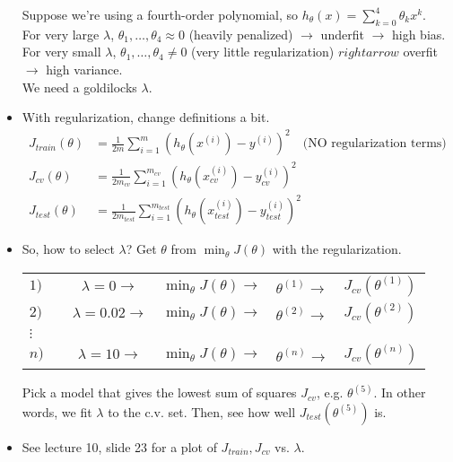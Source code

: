 \documentclass[10pt]{article}
\begin{document}
\begin{itemize}
\begin{equation*}
    \end{equation*}
    Suppose we're using a fourth-order polynomial, so $h_{\theta}(x) =
    \sum_{k=0}^4 \theta_kx^k$.\\ For very large $\lambda$, $\theta_1,
    \dots, \theta_4 \approx 0$ (heavily penalized) $\rightarrow$ underfit
    $\rightarrow$ high bias. \\ For very small $\lambda$, $\theta_1,
    \dots, \theta_4 \neq 0$ (very little regularization) $rightarrow$
    overfit $\rightarrow$ high variance.\\ We need a goldilocks $\lambda$.
  \item With regularization, change definitions a bit.
    \begin{align*}
      J_{train}(\theta) &= \frac{1}{2m}\sum_{i=1}^m \left( h_{\theta}(x^{(i)}) - y^{(i)} \right)^2 \quad \text{(NO regularization terms)} \\
      J_{cv}(\theta) &= \frac{1}{2m_{cv}}\sum_{i=1}^{m_{cv}} \left( h_{\theta}(x_{cv}^{(i)}) - y_{cv}^{(i)} \right)^2\\
      J_{test}(\theta) &= \frac{1}{2m_{test}}\sum_{i=1}^{m_{test}} \left( h_{\theta}(x_{test}^{(i)}) - y_{test}^{(i)} \right)^2
    \end{align*}
  \item So, how to select $\lambda$? Get $\theta$ from $\min_{\theta}J(\theta)$ with the regularization.
    \begin{center}
      \begin{tabular}{ l c c l l }
        $1) \quad$ & $\lambda=0 \rightarrow$ & $\min_{\theta}J(\theta) \rightarrow $ & $\theta^{(1)} \rightarrow$ & $J_{cv}(\theta^{(1)})$ \\
        $2) \quad$ & $\lambda=0.02 \rightarrow$ & $\min_{\theta}J(\theta) \rightarrow$ & $\theta^{(2)} \rightarrow$ & $J_{cv}(\theta^{(2)})$ \\
        $\vdots$ & & & & \\
        $n) \quad$ & $\lambda=10 \rightarrow$ & $\min_{\theta}J(\theta) \rightarrow$ & $\theta^{(n)} \rightarrow$ & $J_{cv}(\theta^{(n)})$
      \end{tabular}
    \end{center}
    Pick a model that gives the lowest sum of squares $J_{cv}$, e.g. $\theta^{(5)}$. In other words, we fit $\lambda$ to the c.v. set. Then, see how well $J_{test}(\theta^{(5)})$ is.
  \item See lecture 10, slide 23 for a plot of $J_{train}, J_{cv}$ vs. $\lambda$.
\end{itemize}
\end{document}
